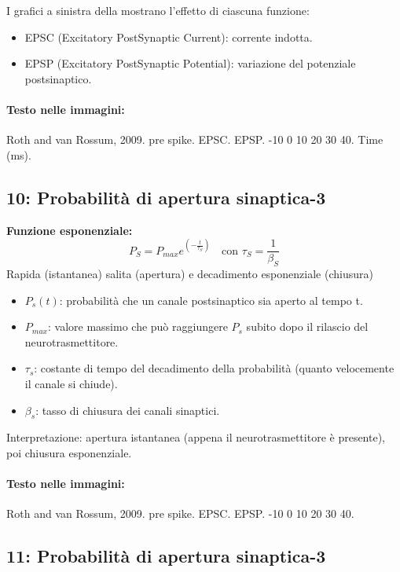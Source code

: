 I grafici a sinistra della  mostrano l'effetto di ciascuna funzione:
\begin{itemize}
    \item EPSC (Excitatory PostSynaptic Current): corrente indotta.
    \item EPSP (Excitatory PostSynaptic Potential): variazione del potenziale postsinaptico.
\end{itemize}

\paragraph*{Testo nelle immagini:}
Roth and van Rossum, 2009. pre spike. EPSC. EPSP. -10 0 10 20 30 40. Time (ms).


\subsection*{ 10: Probabilità di apertura sinaptica-3}

\textbf{Funzione esponenziale:}
\[ P_{S} = P_{max} e^{\left(-\frac{t}{\tau_{S}}\right)} \quad \text{con } \tau_{S} = \frac{1}{\beta_{S}} \]
Rapida (istantanea) salita (apertura) e decadimento esponenziale (chiusura)
\begin{itemize}
    \item $P_{s}(t)$: probabilità che un canale postsinaptico sia aperto al tempo t.
    \item $P_{max}$: valore massimo che può raggiungere $P_{s}$ subito dopo il rilascio del neurotrasmettitore.
    \item $\tau_{s}$: costante di tempo del decadimento della probabilità (quanto velocemente il canale si chiude).
    \item $\beta_{s}$: tasso di chiusura dei canali sinaptici.
\end{itemize}
Interpretazione: apertura istantanea (appena il neurotrasmettitore è presente), poi chiusura esponenziale.

\paragraph*{Testo nelle immagini:}
Roth and van Rossum, 2009. pre spike. EPSC. EPSP. -10 0 10 20 30 40.


\subsection*{ 11: Probabilità di apertura sinaptica-3}

